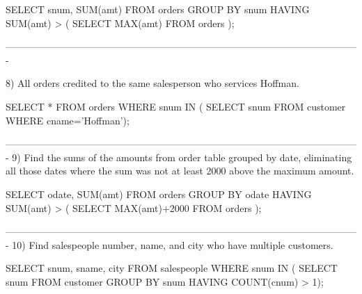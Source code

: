SELECT snum, SUM(amt) FROM orders
GROUP BY snum
HAVING SUM(amt) > (
    SELECT MAX(amt) FROM orders
);


-------------------------------------------------------------------------------------------------------------

8) All orders credited to the same salesperson who services Hoffman.

SELECT * FROM orders WHERE snum IN (
SELECT snum FROM customer WHERE cname='Hoffman');

-------------------------------------------------------------------------------------------------------------
9) Find the sums of the amounts from order table grouped by date, eliminating all those dates where the sum was not at least 2000 above the maximum amount.

SELECT odate, SUM(amt) FROM orders 
GROUP BY odate
HAVING SUM(amt) > (
    SELECT  MAX(amt)+2000 FROM orders
);

-------------------------------------------------------------------------------------------------------------
10) Find salespeople number, name, and city who have multiple customers.

SELECT snum, sname, city FROM salespeople WHERE snum IN (
SELECT snum  FROM customer
GROUP BY snum 
HAVING COUNT(cnum) > 1);